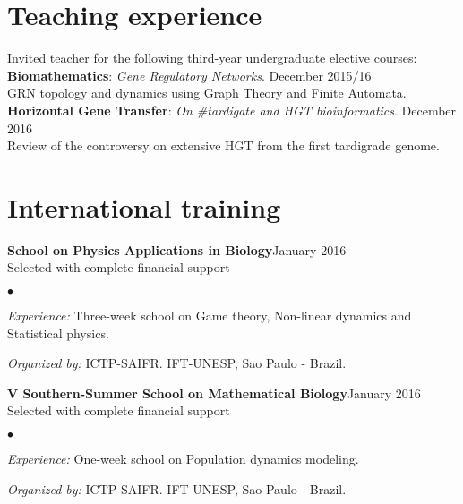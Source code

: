 \documentclass[margin,line]{res}
\newenvironment{list2}{
  \begin{list}{$\bullet$}{%
      \setlength{\itemsep}{0in}
      \setlength{\parsep}{0in} \setlength{\parskip}{0in}
      \setlength{\topsep}{0in} \setlength{\partopsep}{0in}
      \setlength{\leftmargin}{0.2in}}}{\end{list}}
\begin{document}
\begin{resume}
\section{\sc Teaching experience}
Invited teacher for the following third-year undergraduate elective courses: \\
{\bf Biomathematics}:  {\em Gene Regulatory Networks}. \hfill {December 2015/16}\\ GRN topology and dynamics using Graph Theory and Finite Automata. \\ %
{\bf Horizontal Gene Transfer}:  {\em On \#tardigate and HGT bioinformatics}. \hfill {December 2016}\\ Review of the controversy on extensive HGT from the first tardigrade genome. \\

\newpage

\section{\sc International training}
{\bf School on Physics Applications in Biology}\hfill {January 2016}\\
Selected with complete financial support
\begin{list2} %
	\item \textit{Experience:} Three-week school on Game theory, Non-linear dynamics and Statistical physics.
	\item \textit{Organized by:} ICTP-SAIFR. IFT-UNESP, Sao Paulo - Brazil. %
\end{list2}

{\bf V Southern-Summer School on Mathematical Biology}\hfill {January 2016}\\
Selected with complete financial support
\begin{list2} %
	\item \textit{Experience:} One-week school on Population dynamics modeling.
	\item \textit{Organized by:} ICTP-SAIFR. IFT-UNESP, Sao Paulo - Brazil.
\end{list2}


\end{resume}
\end{document}
